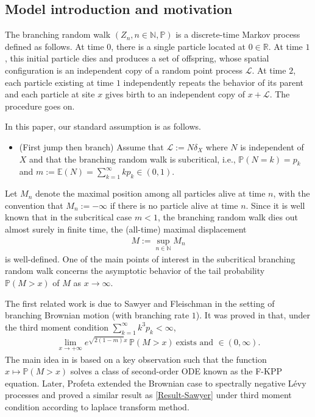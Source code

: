 \documentclass[11pt]{article}
\numberwithin{equation}{section}
\begin{document}
 \subsection{Model introduction and motivation}
 The branching random walk $(Z_n, n\in \mathbb{N}, \mathbb{P})$ is a discrete-time Markov process defined as follows. At time $0$, there is a single particle located at $0 \in \mathbb{R}$. At time $1$, this initial particle dies and produces a set of offspring, whose spatial configuration is an independent copy of a random point process $\mathcal{L}$. At time $2$, each particle existing at time $1$ independently repeats the behavior of its parent and each particle at site $x$ gives birth to an independent copy of $x+\mathcal{L}$. The procedure goes on. 
 
In this paper, our standard assumption is as follows.
\begin{itemize}
	\item[{\bf(H0)}] (First jump then branch) Assume that 	$\mathcal{L}:= N\delta_X$ where  $N $ is independent of $X$ and that the branching random walk is subcritical, i.e.,  $\mathbb{P}(N=k)=p_k$ and $m:= \mathbb{E}(N) =\sum_{k=1}^\infty kp_k \in (0,1)$.
\end{itemize}
Let $M_n$ denote the maximal position among all particles alive at time $n$, with the convention that $M_n := -\infty$ if there is no particle alive at time $n$. Since it is well known that in the subcritical case $m < 1$, the branching random walk dies out almost surely in finite time, the (all-time) maximal displacement 
\begin{align}\label{def-of-M}
	M := \sup_{n \in \mathbb{N}} M_n
\end{align}
is well-defined. One of the main points of interest in the subcritical branching random walk concerns the asymptotic behavior of the tail probability $\mathbb{P}(M > x)$ of $M$ as $x \to \infty$.

The first related work is due to Sawyer and Fleischman \cite{sawyer1979} in the setting of branching Brownian motion (with branching rate $1$). It was proved in \cite{sawyer1979} that, under the third moment condition $\sum_{k=1}^\infty k^3 p_k< \infty$, 
\begin{align}\label{Result-Sawyer}
	\lim_{x \to +\infty} e^{\sqrt{2(1-m)}x} \, \mathbb{P}(M > x)\ \mbox{exists and } \in (0,\infty). 
\end{align}
The main idea in \cite{sawyer1979} is based on a key observation such that the function $x \mapsto \mathbb{P}(M > x)$ solves a class of second-order ODE known as the F-KPP equation. Later, Profeta \cite{profeta24bernoulli} extended the Brownian case to spectrally negative L\'evy processes  and proved a similar result as \eqref{Result-Sawyer}  under third moment condition according to laplace transform method.
\end{document}
